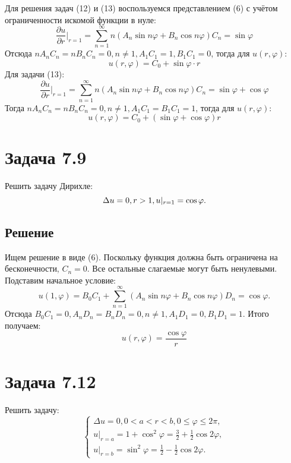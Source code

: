 \documentclass[11pt]{article}
\begin{document}
Для решения задач (12) и (13) воспользуемся представлением (6) с учётом ограниченности искомой функции в нуле:
\begin{equation*}
\frac{\partial u}{\partial r}\bigg|_{r = 1} = \sum_{n = 1}^{\infty}n(A_n\sin n\varphi + B_n\cos n\varphi)C_n = \sin\varphi
\end{equation*}
Отсюда $nA_nC_n = nB_nC_n = 0, n \neq 1, A_1C_1 = 1, B_1C_1 = 0$, тогда для $u(r, \varphi)$:
\begin{equation}
u(r, \varphi) = C_0 + \sin\varphi\cdot r
\end{equation}
Для задачи (13):
\begin{equation*}
\frac{\partial u}{\partial r}\bigg|_{r = 1} = \sum_{n = 1}^{\infty}n(A_n\sin n\varphi + B_n\cos n\varphi)C_n = \sin\varphi + \cos\varphi
\end{equation*}
Тогда $nA_nC_n = nB_nC_n = 0, n \neq 1, A_1C_1 = B_1C_1 = 1$, тогда для $u(r, \varphi)$:
\begin{equation}
u(r, \varphi) = C_0 + (\sin\varphi + \cos\varphi)r
\end{equation}
\section{Задача 7.9}
\label{sec:orgf5487f5}
Решить задачу Дирихле:
\begin{equation}
\Delta u = 0, r > 1, \\
u|_{r = 1} = \cos\varphi.
\end{equation}
\subsection{Решение}
\label{sec:org5cb3cb9}
Ищем решение в виде (6). Поскольку функция должна быть ограничена на бесконечности, $C_n = 0$.
Все остальные слагаемые могут быть ненулевыми. Подставим начальное условие:
\begin{equation*}
u(1, \varphi) = B_0C_1 + \sum_{n = 1}^{\infty}(A_n\sin n\varphi + B_n\cos n\varphi)D_n = \cos\varphi.
\end{equation*}
Отсюда $B_0C_1 = 0, A_nD_n = B_nD_n = 0, n \neq 1, A_1D_1 = 0, B_1D_1 = 1$. Итого получаем:
\begin{equation}
u(r, \varphi) = \frac{\cos\varphi}r
\end{equation}
\section{Задача 7.12}
\label{sec:org7216e6c}
Решить задачу:
\begin{equation}
\begin{cases}
\Delta u = 0, 0 < a < r < b, 0 \leq \varphi \leq 2\pi, \\
u|_{r = a} = 1 + \cos^2\varphi = \frac32 + \frac12\cos2\varphi, \\
u|_{r = b} = \sin^2\varphi = \frac12 - \frac12\cos2\varphi.
\end{cases}
\end{equation}
\end{document}
